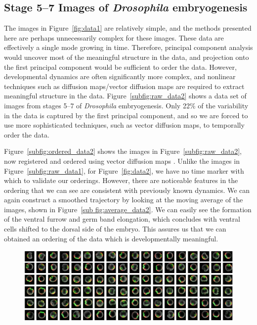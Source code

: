 \documentclass{pnastwo}
\begin{document}
\begin{article}
\subsection{Stage 5--7 Images of {\it Drosophila} embryogenesis}

The images in Figure~\ref{fig:data1} are relatively simple, and the methods presented here are perhaps unnecessarily complex for these images. 
%
These data are effectively a single mode growing in time.
%
Therefore, principal component analysis \cite{shlens2005tutorial} would uncover most of the meaningful structure in the data, and projection onto the first principal component would be sufficient to order the data.
%
However, developmental dynamics are often significantly more complex, and nonlinear techniques such as diffusion maps/vector diffusion maps are required to extract meaningful structure in the data. 
%
Figure~\ref{subfig:raw_data2} shows a data set of images from stages 5--7 of {\it Drosophila} embryogenesis.
%
Only 22\% of the variability in the data is captured by the first principal component, and so we are forced to use more sophisticated techniques, such as vector diffusion maps, to temporally order the data.

Figure~\ref{subfig:ordered_data2} shows the images in Figure~\ref{subfig:raw_data2}, now registered and ordered using vector diffusion maps \cite{singer2012vector}.
%
Unlike the images in Figure~\ref{subfig:raw_data1}, 
for Figure~\ref{fig:data2}, we have no time marker with which to validate our orderings.
%
However, there are noticeable features in the ordering that we can see are consistent with previously known dynamics.
%
We can again construct a smoothed trajectory by looking at the moving average of the images, shown in Figure~\ref{sub fig:average_data2}.
%
We can easily see the formation of the ventral furrow and germ band elongation, which concludes with ventral cells shifted to the dorsal side of the embryo.
%
This assures us that we can obtained an ordering of the data which is developmentally meaningful. 

\newpage
\begin{figure}[t]
\includegraphics[width=16.8cm]{raw_data2}


\end{figure}
\end{article}
\end{document}

